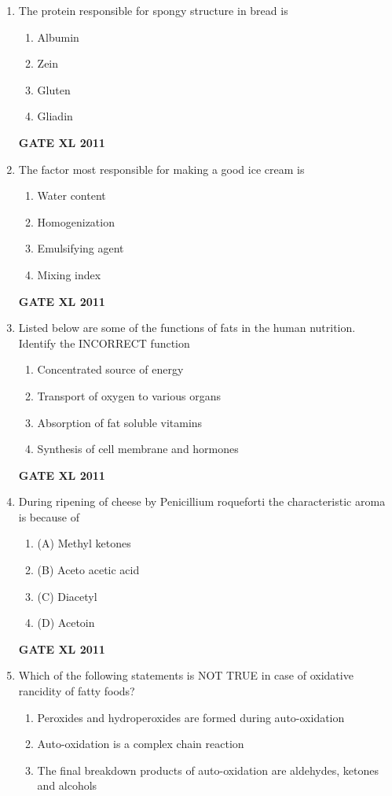 \documentclass[journal,12pt,onecolumn]{IEEEtran}
\begin{document}
\begin{enumerate}
	\item{ The protein responsible for spongy structure in bread is}
\begin{enumerate}
	\item Albumin
	\item Zein
	\item Gluten
	\item Gliadin
\end{enumerate}
\hfill{\textbf{GATE XL 2011}}
	\item{ The factor most responsible for making a good ice cream is}
\begin{enumerate}
	\item Water content 
	\item Homogenization
	\item Emulsifying agent
	\item Mixing index
\end{enumerate}
\hfill{\textbf{GATE XL 2011}}
	\item{ Listed below are some of the functions of fats in the human nutrition. Identify the INCORRECT function}
\begin{enumerate}
	\item Concentrated source of energy
	\item Transport of oxygen to various organs
	\item Absorption of fat soluble vitamins
	\item Synthesis of cell membrane and hormones
\end{enumerate}
\hfill{\textbf{GATE XL 2011}}
	\item{ During ripening of cheese by Penicillium roqueforti the characteristic aroma is because of}
\begin{enumerate}
	\item
(A) Methyl ketones
	\item
(B) Aceto acetic acid
	\item
(C) Diacetyl
	\item
(D) Acetoin
\end{enumerate}
\hfill{\textbf{GATE XL 2011}}
	\item {Which of the following statements is NOT TRUE in case of oxidative rancidity of fatty foods?}
\begin{enumerate}
	\item Peroxides and hydroperoxides are formed during auto-oxidation
	\item Auto-oxidation is a complex chain reaction
	\item The final breakdown products of auto-oxidation are aldehydes, ketones and alcohols

\end{enumerate}
\end{enumerate}
\end{document}
